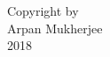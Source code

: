 


\begin{center}
\null
\vfill
\begin{doublespace}
Copyright by \\ 
Arpan Mukherjee \\ 
2018 \\
\end{doublespace}
\end{center}
